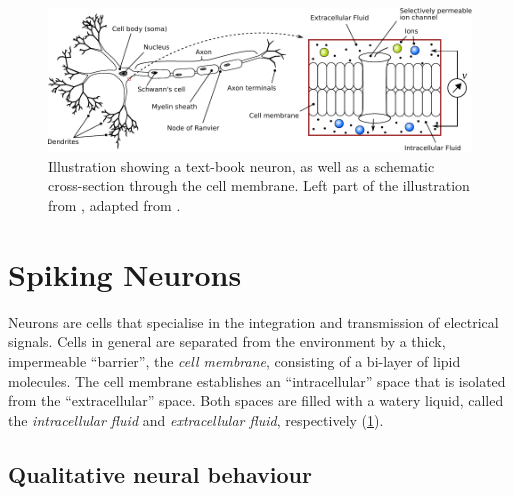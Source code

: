 \documentclass[10pt,letterpaper,oneside]{article}
\begin{document}
\begin{figure}[b]
	\centering
	\includegraphics{media/neuron_sketch_membrane.pdf}
	\caption{Illustration showing a text-book neuron, as well as a schematic cross-section through the cell membrane. Left part of the illustration from \cite{stoeckel2015design}, adapted from \cite{kandel2012principles}.}
	\label{fig:neuron_sketch_membrane}
\end{figure}

\section{Spiking Neurons}


Neurons are cells that specialise in the integration and transmission of electrical signals. Cells in general are separated from the environment by a thick, impermeable \enquote{barrier}, the \emph{cell membrane}, consisting of a bi-layer of lipid molecules. The cell membrane establishes an \enquote{intracellular} space that is isolated from the \enquote{extracellular} space. Both spaces are filled with a watery liquid, called the \emph{intracellular fluid} and \emph{extracellular fluid}, respectively (\cref{fig:neuron_sketch_membrane}).

\subsection{Qualitative neural behaviour}
\end{document}
